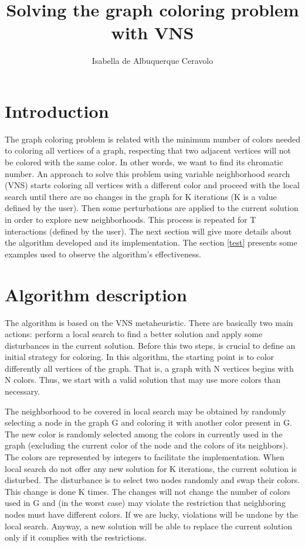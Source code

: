 \documentclass[11pt]{article}
\begin{document}
\author{Isabella de Albuquerque Ceravolo}
\title{Solving the graph coloring problem with VNS}
\maketitle

\section{Introduction}
The graph coloring problem is related with the minimum number of colors needed to coloring all vertices of a graph, respecting that two adjacent vertices will not be colored with the same color. In other words, we want to find its chromatic number. An approach to solve this problem using variable neighborhood search (VNS) starts coloring all vertices with a different color and proceed with the local search until there are no changes in the graph for K iterations (K is a value defined by the user). Then some perturbations are applied to the current solution in order to explore new neighborhoods. This process is repeated for T interactions (defined by the user). The next section will give more details about the algorithm developed and its implementation. The section \ref{test} presents some examples used to observe the algorithm's effectiveness.

\section{Algorithm description}
The algorithm is based on the VNS metaheuristic. There are basically two main actions: perform a local search to find a better solution and apply some disturbances in the current solution. Before this two steps, is crucial to define an initial strategy for coloring. In this algorithm, the starting point is to color differently all vertices of the graph. That is, a graph with N vertices begins with N colors. Thus, we start with a valid solution that may use more colors than necessary.

The neighborhood to be covered in local search may be obtained by randomly selecting a node in the graph G and coloring it with another color present in G. The new color is randomly selected among the colors in currently used in the graph (excluding the current color of the node and the colors of its neighbors). The colors are represented by integers to facilitate the implementation. When local search do not offer any new solution for K iterations, the current solution is disturbed. The disturbance is to select two nodes randomly and swap their colors. This change is done K times. The changes will not change the number of colors used in G and (in the worst case) may violate the restriction that neighboring nodes must have different colors. If we are lucky, violations will be undone by the local search. Anyway, a new solution will be able to replace the current solution only if it complies with the restrictions.
\end{document}
